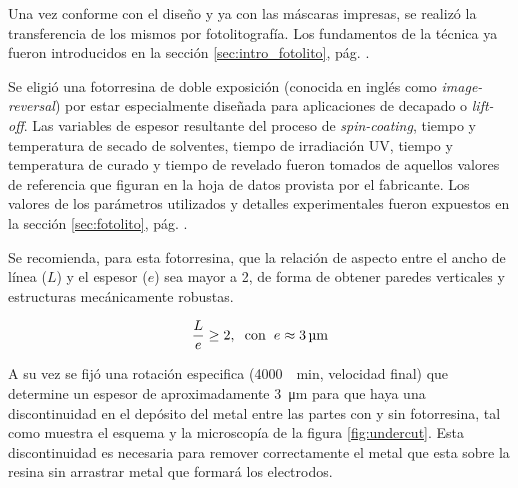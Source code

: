  			 Una vez conforme con el diseño y ya con las máscaras impresas, se realizó la transferencia de los mismos por fotolitografía. Los fundamentos de la técnica ya fueron introducidos en la sección \ref{sec:intro_fotolito}, pág. \pageref{sec:intro_fotolito}.

 			 Se eligió una fotorresina de doble exposición (conocida en inglés como \textit{image-reversal}) por estar especialmente diseñada para aplicaciones de decapado o \textit{lift-off}. Las variables de espesor resultante del proceso de \textit{spin-coating}, tiempo y temperatura de secado de solventes, tiempo de irradiación UV, tiempo y temperatura de curado y tiempo de revelado fueron tomados de aquellos valores de referencia que figuran en la hoja de datos provista por el fabricante. \cite{TI35E} Los valores de los parámetros utilizados y detalles experimentales fueron expuestos en la sección \ref{sec:fotolito}, pág. \pageref{sec:fotolito}.

 			 Se recomienda, para esta fotorresina, que la relación de aspecto entre el ancho de línea ($L$) y el espesor ($e$) sea mayor a 2, de forma de obtener paredes verticales y estructuras mecánicamente robustas. 

 				\begin{equation}
				\frac{L}{e} \geq 2, \hspace*{0.2cm}\text{con}\hspace{0.2cm}  e \approx \SI{3}{\um}		
 				\end{equation}

     		 A su vez se fijó una rotación especifica (\SI{4000}{\per\minute}, velocidad final) que determine un espesor de aproximadamente \SI{3}{\um} para que haya una discontinuidad en el depósito del metal entre las partes con y sin fotorresina, tal como muestra el esquema y la microscopía de la figura \ref{fig:undercut}. Esta discontinuidad es necesaria para remover correctamente el metal que esta sobre la resina sin arrastrar metal que formará los electrodos. 

